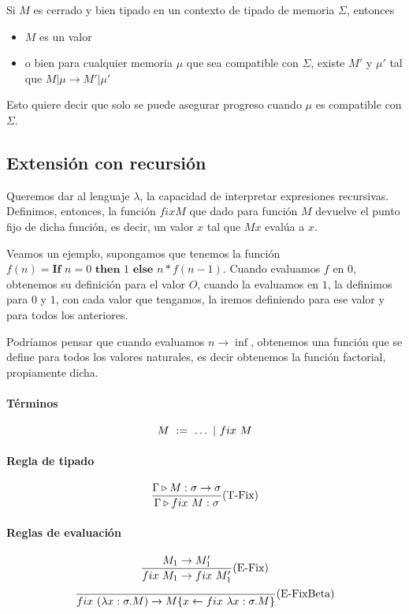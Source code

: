 \begin{centrado}
    Si $M$ es cerrado y bien tipado en un contexto de tipado de memoria $\Sigma$, entonces
    \begin{itemize}
        \item $M$ es un valor
        \item o bien para cualquier memoria $\mu$ que sea compatible con $\Sigma$, existe $M'$ y $\mu'$ tal que $M|\mu\to M'|\mu'$
    \end{itemize}
\end{centrado}

Esto quiere decir que solo se puede asegurar progreso cuando $\mu$ es compatible con $\Sigma$.

\subsection{Extensión con recursión}\label{lambda_calculo:recursion}
Queremos dar al lenguaje $\lambda$, la capacidad de interpretar expresiones recursivas. Definimos, entonces, la función $fix M$ que dado para función $M$ devuelve el punto fijo de dicha función, es decir, un valor $x$ tal que $M x$ evalúa a $x$.

Veamos un ejemplo, supongamos que tenemos la función $f(n) = \textbf{If } n=0 \textbf{ then } 1 \textbf{ else } n*f(n-1)$. Cuando evaluamos $f$ en $0$, obtenemos su definición para el valor $O$, cuando la evaluamos en $1$, la definimos para $0$ y $1$, con cada valor que tengamos, la iremos definiendo para ese valor y para todos los anteriores. 

Podríamos pensar que cuando evaluamos $n\to\inf$, obtenemos una función que se define para todos los valores naturales, es decir obtenemos la función factorial, propiamente dicha.

\paragraph{Términos}
$$M~:=~\dots~|~fix~M$$

\paragraph{Regla de tipado}
\begin{equation*}
    \frac{\Gamma\triangleright M : \sigma\to\sigma}{\Gamma\triangleright fix~M : \sigma}(\text{T-Fix})
\end{equation*}

\paragraph{Reglas de evaluación}
\begin{equation*}
    \frac{M_1\to M'_1}{fix~M_1\to fix~M'_1}(\text{E-Fix})
\end{equation*}
\vspace*{5mm}
\begin{equation*}
\frac{}{fix~(\lambda x: \sigma . M)\to M\{x\leftarrow fix~\lambda x: \sigma . M\}}(\text{E-FixBeta})
\end{equation*}